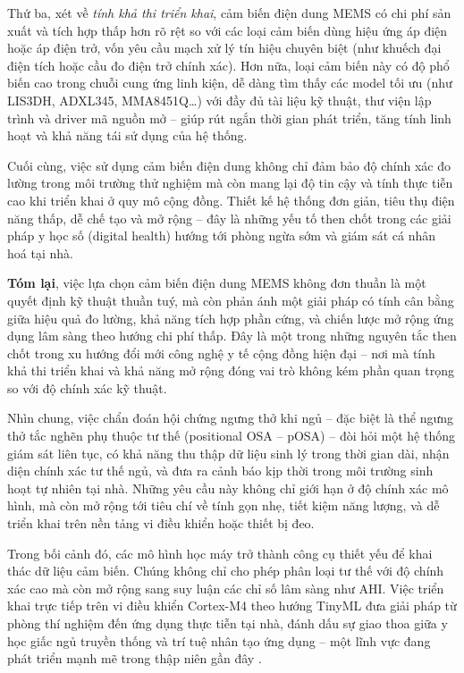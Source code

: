 Thứ ba, xét về \textit{tính khả thi triển khai}, cảm biến điện dung 
MEMS có chi phí sản xuất và tích hợp thấp hơn rõ rệt so với các loại 
cảm biến dùng hiệu ứng áp điện hoặc áp điện trở, vốn yêu cầu mạch xử 
lý tín hiệu chuyên biệt (như khuếch đại điện tích hoặc cầu đo điện 
trở chính xác). Hơn nữa, loại cảm biến này có độ phổ biến cao trong 
chuỗi cung ứng linh kiện, dễ dàng tìm thấy các model tối ưu 
(như LIS3DH, ADXL345, MMA8451Q\ldots) với đầy đủ tài liệu kỹ thuật, 
thư viện lập trình và driver mã nguồn mở – giúp rút ngắn thời gian 
phát triển, tăng tính linh hoạt và khả năng tái sử dụng của hệ thống.

Cuối cùng, việc sử dụng cảm biến điện dung không chỉ đảm bảo độ 
chính xác đo lường trong môi trường thử nghiệm mà còn mang lại 
độ tin cậy và tính thực tiễn cao khi triển khai ở quy mô cộng đồng. 
Thiết kế hệ thống đơn giản, tiêu thụ điện năng thấp, dễ chế tạo và 
mở rộng – đây là những yếu tố then chốt trong các giải pháp y học số 
(digital health) hướng tới phòng ngừa sớm và giám sát cá nhân hoá tại 
nhà.

\textbf{Tóm lại}, việc lựa chọn cảm biến điện dung MEMS không đơn thuần là một quyết định kỹ thuật thuần tuý, mà còn phản ánh một giải pháp có tính cân bằng giữa hiệu quả đo lường, khả năng tích hợp phần cứng, và chiến lược mở rộng ứng dụng lâm sàng theo hướng chi phí thấp. Đây là một trong những nguyên tắc then chốt trong xu hướng đổi mới công nghệ y tế cộng đồng hiện đại – nơi mà tính khả thi triển khai và khả năng mở rộng đóng vai trò không kém phần quan trọng so với độ chính xác kỹ thuật.

\vspace{1em}

Nhìn chung, việc chẩn đoán hội chứng ngưng thở khi ngủ – đặc biệt là thể ngưng thở tắc nghẽn phụ thuộc tư thế (positional OSA – pOSA) – đòi hỏi một hệ thống giám sát liên tục, có khả năng thu thập dữ liệu sinh lý trong thời gian dài, nhận diện chính xác tư thế ngủ, và đưa ra cảnh báo kịp thời trong môi trường sinh hoạt tự nhiên tại nhà. Những yêu cầu này không chỉ giới hạn ở độ chính xác mô hình, mà còn mở rộng tới tiêu chí về tính gọn nhẹ, tiết kiệm năng lượng, và dễ triển khai trên nền tảng vi điều khiển hoặc thiết bị đeo. 

Trong bối cảnh đó, các mô hình học máy trở thành công cụ thiết yếu 
để khai thác dữ liệu cảm biến. Chúng không chỉ cho phép phân loại tư 
thế với độ chính xác cao mà còn mở rộng sang suy luận các chỉ số lâm 
sàng như AHI. Việc triển khai trực tiếp trên vi điều khiển Cortex-M4 
theo hướng TinyML đưa giải pháp từ phòng thí nghiệm đến ứng dụng 
thực tiễn tại nhà, đánh dấu sự giao thoa giữa y học giấc ngủ truyền 
thống và trí tuệ nhân tạo ứng dụng – một lĩnh vực đang phát triển 
mạnh mẽ trong thập niên gần đây \cite{osa_sanchez2025}.

